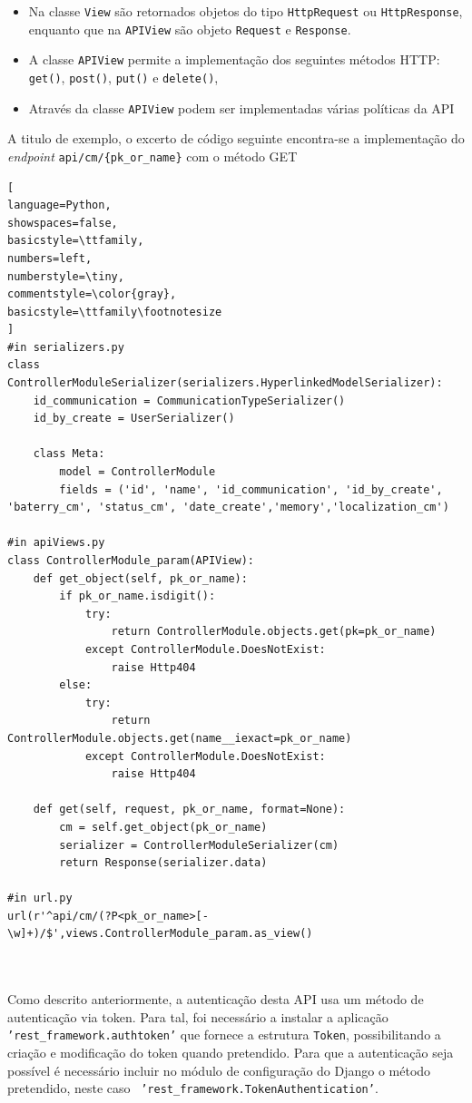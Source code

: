 \begin{itemize}
	\item Na classe \texttt{View} são retornados objetos do tipo \texttt{HttpRequest} ou \texttt{HttpResponse}, enquanto que na \texttt{APIView} são objeto \texttt{Request} e \texttt{Response}.
	\item A classe \texttt{APIView} permite a implementação dos seguintes métodos \ac{HTTP}: 	\texttt{get()}, \texttt{post()}, \texttt{put()} e \texttt{delete()},
	\item Através da classe  \texttt{APIView} podem ser implementadas várias políticas da \ac{API} 
\end{itemize}

 
A titulo de exemplo, o excerto de código seguinte encontra-se a implementação do \textit{endpoint} \texttt{api/cm/\{pk\_or\_name\}} com o método GET

\begin{lstlisting}[
language=Python,
showspaces=false,
basicstyle=\ttfamily,
numbers=left,
numberstyle=\tiny,
commentstyle=\color{gray},
basicstyle=\ttfamily\footnotesize
]
#in serializers.py
class ControllerModuleSerializer(serializers.HyperlinkedModelSerializer):
	id_communication = CommunicationTypeSerializer()
	id_by_create = UserSerializer()

	class Meta:
		model = ControllerModule
		fields = ('id', 'name', 'id_communication', 'id_by_create', 'baterry_cm', 'status_cm', 'date_create','memory','localization_cm')

#in apiViews.py 
class ControllerModule_param(APIView):
	def get_object(self, pk_or_name):
		if pk_or_name.isdigit():
			try:
				return ControllerModule.objects.get(pk=pk_or_name)
			except ControllerModule.DoesNotExist:
				raise Http404
		else:
			try:
				return ControllerModule.objects.get(name__iexact=pk_or_name)
			except ControllerModule.DoesNotExist:
				raise Http404
	
	def get(self, request, pk_or_name, format=None):
		cm = self.get_object(pk_or_name)
		serializer = ControllerModuleSerializer(cm)
		return Response(serializer.data)

#in url.py
url(r'^api/cm/(?P<pk_or_name>[-\w]+)/$',views.ControllerModule_param.as_view()



\end{lstlisting}



Como descrito anteriormente, a autenticação desta API usa um método de autenticação via token. Para tal, foi necessário a instalar a aplicação \texttt{'rest\_framework.authtoken'} que fornece a estrutura \texttt{Token}, possibilitando a criação e modificação do token quando pretendido. Para que a autenticação seja possível é necessário incluir no módulo de configuração do Django o método pretendido, neste caso  \ \texttt{'rest\_framework.TokenAuthentication'}.

